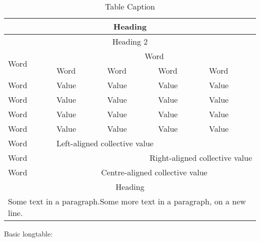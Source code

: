 \documentclass[11pt, english]{article}
\begin{document}
	\begin{table}[h]
		\scriptsize
		\renewcommand{\arraystretch}{1.25}
	\begin{center}
	\begin{tabular}{p{3cm}|p{2cm}p{2cm}p{2cm}p{2cm}}
		\hline
		\hline
		\multicolumn{5}{c}{Heading}\\
		\hline
		\hline
		\multicolumn{5}{c}{Heading 2}\\
		\hline
		\multirow{2}{*}{Word} & \multicolumn{4}{c}{Word}\\
		\cline{2-5}
		& Word & Word & Word & Word\\
		\hline
		Word & Value & Value & Value & Value\\
                Word & Value & Value & Value & Value\\
                Word & Value & Value & Value & Value\\
                Word & Value & Value & Value & Value\\
		\hline
		Word & \multicolumn{4}{l}{Left-aligned collective value}\\
		Word & \multicolumn{4}{r}{Right-aligned collective value}\\
		Word & \multicolumn{4}{c}{Centre-aligned collective value}\\
		\hline
		\hline
		\multicolumn{5}{c}{Heading}\\
		\hline
		\hline
		\multicolumn{5}{p{11.5cm}}{Some text in a paragraph.\newline Some more text in a paragraph, on a new line.}\\
		\hline
	\end{tabular}
		\caption{Table Caption}
	\end{center}
	\end{table}

	Basic longtable:
\end{document}
